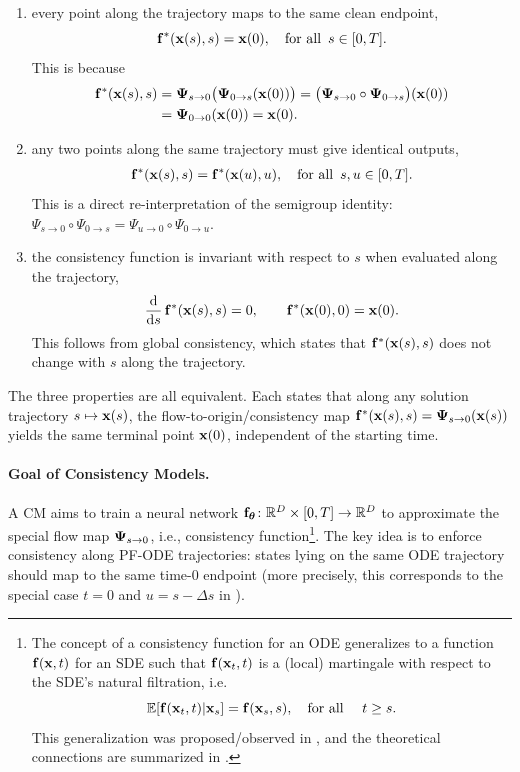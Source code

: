 \begin{enumerate}
    \item[(i)]  every point along the trajectory maps to the same clean endpoint,
    \[
       {\mathbf{f}}^*({\mathbf{x}}(s), s) = {\mathbf{x}}(0), \quad \text{for all }\, s \in [0,T].
    \]
    This is because 
\begin{align*}
{\mathbf{f}}^*({\mathbf{x}}(s),s)
&= {\bm{\Psi}}_{s\to 0}\big({\bm{\Psi}}_{0\to s}({\mathbf{x}}(0))\big)
= \big({\bm{\Psi}}_{s\to 0}\circ {\bm{\Psi}}_{0\to s}\big)({\mathbf{x}}(0))
\\&= {\bm{\Psi}}_{0\to 0}({\mathbf{x}}(0))
= {\mathbf{x}}(0).
\end{align*}
    \item[(ii)]  any two points along the same trajectory must give identical outputs,
    \begin{align}\label{eq:cm-self-consistency}
       {\mathbf{f}}^*({\mathbf{x}}(s), s) = {\mathbf{f}}^*({\mathbf{x}}(u), u), \quad \text{for all }\, s, u \in [0,T].
    \end{align}
    This is a direct re-interpretation of the semigroup identity: $\Psi_{s\rightarrow 0}\circ\Psi_{0\rightarrow s}=\Psi_{u\rightarrow 0}\circ\Psi_{0\rightarrow u}$.
    \item[(iii)]  the consistency function is invariant with respect to $s$ when evaluated along the trajectory,
    \begin{align}\label{eq:cm-diff}
        \frac{\mathop{}\!\mathrm{d}}{\mathop{}\!\mathrm{d} s}\,{\mathbf{f}}^*({\mathbf{x}}(s),s) = 0,
        \qquad {\mathbf{f}}^*({\mathbf{x}}(0),0) = {\mathbf{x}}(0).
    \end{align}
This follows from global consistency, which states that ${\mathbf{f}}^*({\mathbf{x}}(s), s)$ does
not change with $s$ along the trajectory.
\end{enumerate}
The three properties are all equivalent. Each states that along any solution trajectory $s\mapsto {\mathbf{x}}(s)$,
the flow-to-origin/consistency map ${\mathbf{f}}^*({\mathbf{x}}(s),s)={\bm{\Psi}}_{s\to 0}({\mathbf{x}}(s))$
yields the same terminal point ${\mathbf{x}}(0)$, independent of the starting time.


\paragraph{Goal of Consistency Models.}
A CM aims to train a neural network 
${\mathbf{f}}_{\bm{\theta}} \colon \mathbb{R}^D \times [0,T] \to \mathbb{R}^D$ 
to approximate the special flow map ${\bm{\Psi}}_{s\to 0}$, i.e., consistency function\footnote{The concept of a consistency function for an ODE generalizes to a function
${\mathbf{f}}({\mathbf{x}},t)$ for an SDE such that ${\mathbf{f}}({\mathbf{x}}_t,t)$ is a (local) martingale with
respect to the SDE’s natural filtration, i.e.
\[
\mathbb{E}[{\mathbf{f}}({\mathbf{x}}_t,t)|{\mathbf{x}}_s]={\mathbf{f}}({\mathbf{x}}_s,s),\quad\text{for all }\quad t\ge s.
\]
This generalization was proposed/observed in \citep{daras2023consistent,lai2023fp},
and the theoretical connections are summarized in \citep{lai2023equivalence}.}. 
The key idea is to enforce consistency along PF-ODE trajectories: states lying
on the same ODE trajectory should map to the same time-$0$ endpoint
(more precisely, this corresponds to the special case $t=0$ and
$u=s-\Delta s$ in ).

